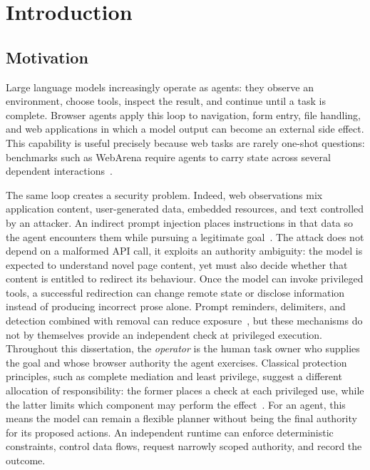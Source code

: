 \chapter{Introduction}
\label{chap:introduction}

\section{Motivation}

Large language models increasingly operate as agents: they observe an
environment, choose tools, inspect the result, and continue until a task is
complete. Browser agents apply this loop to navigation, form entry, file
handling, and web applications in which a model output can become an external
side effect. This capability is useful precisely because web tasks are rarely
one-shot questions: benchmarks such as WebArena require agents to carry state
across several dependent interactions~\cite{zhou2024webarena}.

The same loop creates a security problem. Indeed, web observations mix application
content, user-generated data, embedded resources, and text controlled by an
attacker. An indirect prompt injection places instructions in that data so the
agent encounters them while pursuing a legitimate goal~\cite{greshake2023indirect}.
The attack does not depend on a malformed API call, it exploits an authority
ambiguity: the model is expected to understand novel page content, yet must
also decide
whether that content is entitled to redirect its behaviour. Once the model can
invoke privileged tools, a successful redirection can change remote state or
disclose information instead of producing incorrect prose alone.
Prompt reminders, delimiters, and detection combined with removal can reduce
exposure~\cite{yi2025bipia,hines2024spotlighting,chen2025detectremove}, but these
mechanisms do not by themselves provide an independent check at privileged
execution. Throughout this dissertation, the \emph{operator} is
the human task owner who supplies the goal and whose browser authority the
agent exercises. Classical protection principles, such as complete mediation
and least privilege, suggest a different allocation of responsibility: the
former places a check at each privileged use, while the latter limits which
component may perform the effect~\cite{saltzer1975protection}. For an agent,
this means the model can remain a
flexible planner without being the final authority for its proposed actions.
An independent runtime can enforce deterministic constraints, control data
flows, request narrowly scoped authority, and record the outcome.

